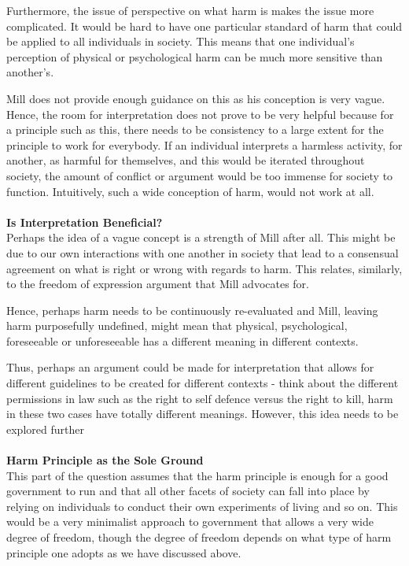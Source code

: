 \documentclass[12pt, letterpaper]{article}
\begin{document}
Furthermore, the issue of perspective on what harm is makes the issue more complicated. It would be hard to have one particular standard of harm that could be applied to all individuals in society. This means that one individual's perception of physical or psychological harm can be much more sensitive than another's.

Mill does not provide enough guidance on this as his conception is very vague. Hence, the room for interpretation does not prove to be very helpful because for a principle such as this, there needs to be consistency to a large extent for the principle to work for everybody. If an individual interprets a harmless activity, for another, as harmful for themselves, and this would be iterated throughout society, the amount of conflict or argument would be too immense for society to function. Intuitively, such a wide conception of harm, would not work at all.
\\\\
\textbf{Is Interpretation Beneficial?}\\
Perhaps the idea of a vague concept is a strength of Mill after all. This might be due to our own interactions with one another in society that lead to a consensual agreement on what is right or wrong with regards to harm. This relates, similarly, to the freedom of expression argument that Mill advocates for.

Hence, perhaps harm needs to be continuously re-evaluated and Mill, leaving harm purposefully undefined, might mean that physical, psychological, foreseeable or unforeseeable has a different meaning in different contexts.

Thus, perhaps an argument could be made for interpretation that allows for different guidelines to be created for different contexts - think about the different permissions in law such as the right to self defence versus the right to kill, harm in these two cases have totally different meanings. However, this idea needs to be explored further\
\\\\
\textbf{Harm Principle as the Sole Ground}\\
This part of the question assumes that the harm principle is enough for a good government to run and that all other facets of society can fall into place by relying on individuals to conduct their own experiments of living and so on. This would be a very minimalist approach to government that allows a very wide degree of freedom, though the degree of freedom depends on what type of harm principle one adopts as we have discussed above.
\end{document}
